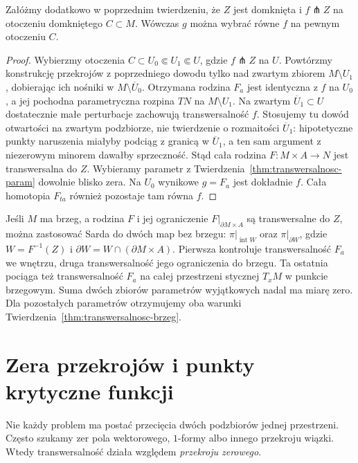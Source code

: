 \begin{wniosek}
\label{cor:transwersalnosc-wzgledna}
Załóżmy dodatkowo w poprzednim twierdzeniu,
że $Z$ jest domknięta i $f\pitchfork Z$
na otoczeniu domkniętego $C\subset M$.
Wówczas $g$ można wybrać równe $f$
na pewnym otoczeniu $C$.
\end{wniosek}
\begin{proof}
Wybierzmy otoczenia
$C\subset U_0\Subset U_1\Subset U$,
gdzie $f\pitchfork Z$ na $U$.
Powtórzmy konstrukcję przekrojów z poprzedniego
dowodu tylko nad zwartym zbiorem
$M\setminus U_1$, dobierając ich nośniki
w $M\setminus\overline U_0$.
Otrzymana rodzina $F_a$ jest identyczna z
$f$ na $U_0$, a jej pochodna parametryczna
rozpina $TN$ na $M\setminus U_1$.
Na zwartym $\overline U_1\subset U$ dostatecznie małe
perturbacje zachowują transwersalność $f$. Stosujemy
tu dowód otwartości na zwartym podzbiorze, nie twierdzenie
o rozmaitości $\overline U_1$: hipotetyczne punkty
naruszenia miałyby podciąg z granicą w $\overline U_1$,
a ten sam argument z niezerowym minorem dawałby sprzeczność.
Stąd cała rodzina $F:M\times A\to N$
jest transwersalna do $Z$.
Wybieramy parametr z
Twierdzenia~\ref{thm:transwersalnosc-param}
dowolnie blisko zera. Na $U_0$ wynikowe
$g=F_a$ jest dokładnie $f$. Cała homotopia $F_{ta}$
również pozostaje tam równa $f$.
\end{proof}

Jeśli $M$ ma brzeg, a rodzina $F$ i jej
ograniczenie $F|_{\partial M\times A}$
są transwersalne do $Z$, można zastosować
Sarda do dwóch map bez brzegu:
$\pi|_{\operatorname{int}W}$ oraz $\pi|_{\partial W}$,
gdzie $W=F^{-1}(Z)$ i $\partial W=W\cap(\partial M\times A)$.
Pierwsza kontroluje transwersalność $F_a$ we wnętrzu,
druga transwersalność jego ograniczenia do brzegu.
Ta ostatnia pociąga też transwersalność $F_a$ na całej
przestrzeni stycznej $T_xM$ w punkcie brzegowym.
Suma dwóch zbiorów parametrów wyjątkowych
nadal ma miarę zero. Dla pozostałych
parametrów otrzymujemy oba warunki
Twierdzenia~\ref{thm:transwersalnosc-brzeg}.

\section{Zera przekrojów i punkty krytyczne funkcji}
\label{sec:transwersalnosc-przekroje}

Nie każdy problem ma postać przecięcia dwóch
podzbiorów jednej przestrzeni. Często szukamy
zer pola wektorowego, $1$-formy albo innego
przekroju wiązki. Wtedy transwersalność działa
względem \emph{przekroju zerowego}.

